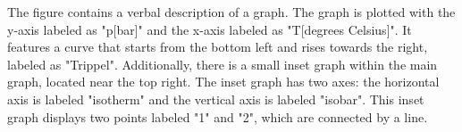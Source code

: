 The figure contains a verbal description of a graph. The graph is plotted with the y-axis labeled as "p[bar]" and the x-axis labeled as "T[degrees Celsius]". It features a curve that starts from the bottom left and rises towards the right, labeled as "Trippel". Additionally, there is a small inset graph within the main graph, located near the top right. The inset graph has two axes: the horizontal axis is labeled "isotherm" and the vertical axis is labeled "isobar". This inset graph displays two points labeled "1" and "2", which are connected by a line.